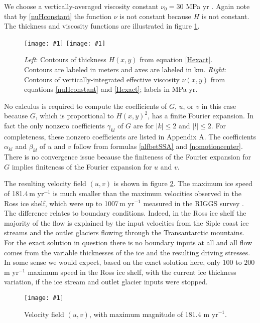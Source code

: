\documentclass[12pt]{amsart}%
\theoremstyle{plain}
\theoremstyle{definition}
\newcommand{\regfigure}[2]{\texttt{[image: \#1]}}
\begin{document}
We choose a vertically-averaged viscosity constant $\nu_0 = 30$ MPa yr \cite{Ritzetal2001}.  Again note that by \eqref{nuHconstant} the function $\nu$ is not constant because $H$ is not constant.  The thickness and viscosity functions are illustrated in figure \ref{fig:nuthick}.

\begin{figure}[ht]
\regfigure{testJ_H_contour}{2.4} \qquad \regfigure{testJ_nu_contour}{2.4}
\medskip
\caption{\emph{Left}: Contours of thickness $H(x,y)$ from equation \eqref{Hexact}.  Contours are labeled in meters and axes are labeled in km.  \emph{Right}: Contours of vertically-integrated effective viscosity $\nu(x,y)$ from equations \eqref{nuHconstant} and \eqref{Hexact}; labels in MPa yr.}
\label{fig:nuthick}
\end{figure}

No calculus is required to compute the coefficients of $G$, $u$, or $v$ in this case because $G$, which is proportional to $H(x,y)^2$, has a finite Fourier expansion.  In fact the only nonzero coefficients $\gamma_{kl}$ of $G$ are for $|k| \le 2$ and $|l| \le 2$.  For completeness, these nonzero coefficients are listed in Appendix A.  The coefficients $\alpha_{kl}$ and $\beta_{kl}$ of $u$ and $v$ follow from formulas \eqref{alfbetSSA} and \eqref{nomotioncenter}.  There is no convergence issue because the finiteness of the Fourier expansion for $G$ implies finiteness of the Fourier expansion for $u$ and $v$.  

The resulting velocity field $(u,v)$ is shown in figure \ref{fig:uv}.  The maximum ice speed of 181.4\,m $\text{yr}^{-1}$ is much smaller than the maximum velocities observed in the Ross ice shelf, which were up to 1007\,m $\text{yr}^{-1}$ measured in the RIGGS survey \cite{RIGGS2,RIGGS1}.  The difference relates to boundary conditions.  Indeed, in the Ross ice shelf the majority of the flow is explained by the input velocities from the Siple coast ice streams and the outlet glaciers flowing through the Transantarctic mountains.  For the exact solution in question there is no boundary inputs at all and all flow comes from the variable thicknesses of the ice and the resulting driving stresses.  In some sense we would expect, based on the exact solution here, only $100$ to $200$\,m $\text{yr}^{-1}$ maximum speed in the Ross ice shelf, with the current ice thickness variation, if the ice stream and outlet glacier inputs were stopped.

\begin{figure}[ht]
\regfigure{testJ_uv_quiver}{2.6}
\caption{Velocity field $(u,v)$, with maximum magnitude of 181.4 m $\text{yr}^{-1}$.}
\label{fig:uv}
\end{figure}
\end{document}
